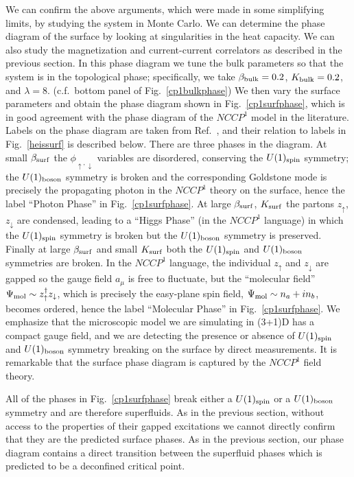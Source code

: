 \documentclass[prb,twocolumn]{revtex4-1}
\newcommand{\nccp}{$NCCP^1$ }
\begin{document}
We can confirm the above arguments, which were made in some simplifying limits, by studying the system in Monte Carlo. We can determine the phase diagram of the surface by looking at singularities in the heat capacity. We can also study the magnetization and current-current correlators as described in the previous section. In this phase diagram we tune the bulk parameters so that the system is in the topological phase; specifically, we take $\beta_{\rm bulk}=0.2$, $K_{\rm bulk}=0.2$, and $\lambda=8$. (c.f.~bottom panel of Fig.~\ref{cp1bulkphase}) We then vary the surface parameters and obtain the phase diagram shown in Fig.~\ref{cp1surfphase}, which is in good agreement with the phase diagram of the $NCCP^1$ model in the literature. Labels on the phase diagram are taken from Ref.~, and their relation to labels in Fig.~\ref{heissurf} is described below.
There are three phases in the diagram. At small $\beta_{\rm surf}$ the $\phi_{\uparrow, \downarrow}$ variables are disordered, conserving the $U(1)_{\rm spin}$ symmetry; the $U(1)_{\rm boson}$ symmetry is broken and the corresponding Goldstone mode is precisely the propagating photon in the \nccp theory on the surface, hence the label ``Photon Phase'' in Fig.~\ref{cp1surfphase}. 
At large $\beta_{\rm surf}$, $K_{\rm surf}$ the partons $z_\uparrow$, $z_\downarrow$ are condensed, leading to a ``Higgs Phase'' (in the \nccp language) in which the $U(1)_{\rm spin}$ symmetry is broken but the $U(1)_{\rm boson}$ symmetry is preserved. 
Finally at large $\beta_{\rm surf}$ and small $K_{\rm surf}$ both the $U(1)_{\rm spin}$ and $U(1)_{\rm boson}$ symmetries are broken.  In the \nccp language, the individual $z_\uparrow$ and $z_\downarrow$ are gapped so the gauge field $a_\mu$ is free to fluctuate, but the ``molecular field'' $\Psi_{\rm mol} \sim z_\uparrow^\dagger z_\downarrow$, which is precisely the easy-plane spin field, $\Psi_{\rm mol} \sim n_a + in_b$, becomes ordered, hence the label ``Molecular Phase'' in Fig.~\ref{cp1surfphase}.
We emphasize that the microscopic model we are simulating in (3+1)D has a compact gauge field, and we are detecting the presence or absence of $U(1)_{\rm spin}$ and $U(1)_{\rm boson}$ symmetry breaking on the surface by direct measurements.  It is remarkable that the surface phase diagram is captured by the \nccp field theory.   

All of the phases in Fig.~\ref{cp1surfphase} break either a $U(1)_{\rm spin}$ or a $U(1)_{\rm boson}$ symmetry and are therefore superfluids. As in the previous section, without access to the properties of their gapped excitations we cannot directly confirm that they are the predicted surface phases. As in the previous section, our phase diagram contains a direct transition between the superfluid phases which is predicted to be a deconfined critical point.\cite{SenthilVishwanath}
\end{document}
